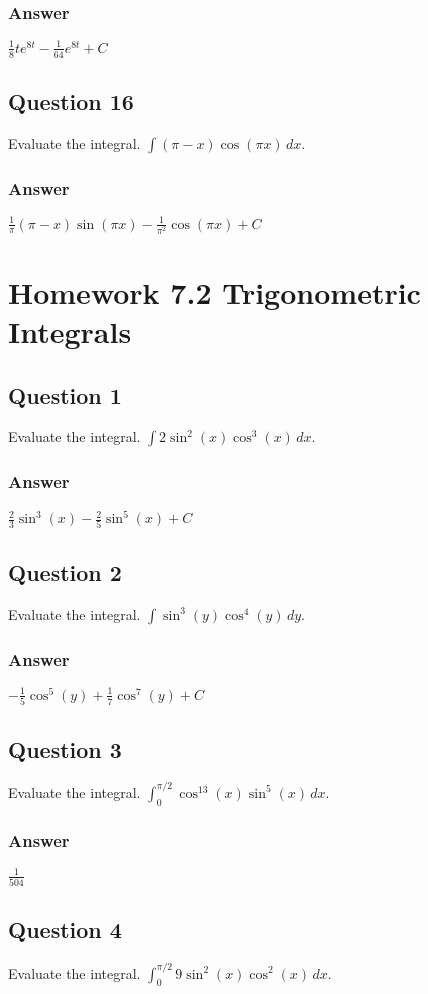 \documentclass{article}
\begin{document}
\subsubsection*{Answer}
$ \frac{1}{8}te^{8t} - \frac{1}{64}e^{8t} + C $

\subsection*{Question 16}
Evaluate the integral. $\int (\pi-x)\cos(\pi x) \,dx$.
\subsubsection*{Answer}
$ \frac{1}{\pi}(\pi-x)\sin(\pi x) - \frac{1}{\pi^2}\cos(\pi x) + C $

\newpage
\section{Homework 7.2 Trigonometric Integrals}

\subsection*{Question 1}
Evaluate the integral. $\int 2\sin^2(x)\cos^3(x) \,dx$.
\subsubsection*{Answer}
$ \frac{2}{3}\sin^3(x) - \frac{2}{5}\sin^5(x) + C $

\subsection*{Question 2}
Evaluate the integral. $\int \sin^3(y)\cos^4(y) \,dy$.
\subsubsection*{Answer}
$ -\frac{1}{5}\cos^5(y) + \frac{1}{7}\cos^7(y) + C $

\subsection*{Question 3}
Evaluate the integral. $\int_0^{\pi/2} \cos^{13}(x)\sin^5(x) \,dx$.
\subsubsection*{Answer}
$ \frac{1}{504} $

\subsection*{Question 4}
Evaluate the integral. $\int_0^{\pi/2} 9\sin^2(x)\cos^2(x) \,dx$.
\end{document}
